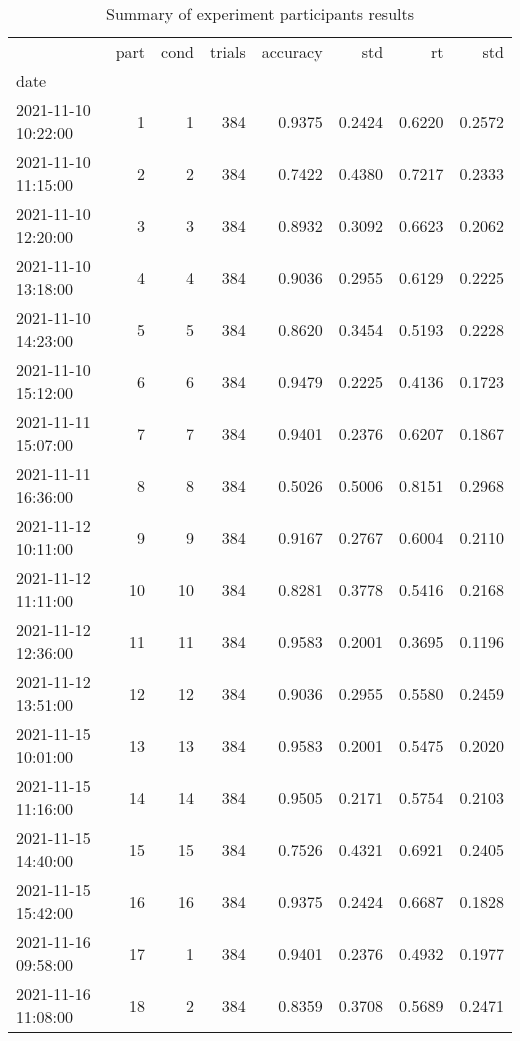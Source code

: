 \begin{table}
\centering
\caption{Summary of experiment participants results}
\label{table-subject-summary}
\begin{tabular}{lrrrrrrr}
\toprule
{} & part & cond & trials & accuracy &    std &     rt &    std \\
date                &      &      &        &          &        &        &        \\
\midrule
2021-11-10 10:22:00 &    1 &    1 &    384 &   0.9375 & 0.2424 & 0.6220 & 0.2572 \\
2021-11-10 11:15:00 &    2 &    2 &    384 &   0.7422 & 0.4380 & 0.7217 & 0.2333 \\
2021-11-10 12:20:00 &    3 &    3 &    384 &   0.8932 & 0.3092 & 0.6623 & 0.2062 \\
2021-11-10 13:18:00 &    4 &    4 &    384 &   0.9036 & 0.2955 & 0.6129 & 0.2225 \\
2021-11-10 14:23:00 &    5 &    5 &    384 &   0.8620 & 0.3454 & 0.5193 & 0.2228 \\
2021-11-10 15:12:00 &    6 &    6 &    384 &   0.9479 & 0.2225 & 0.4136 & 0.1723 \\
2021-11-11 15:07:00 &    7 &    7 &    384 &   0.9401 & 0.2376 & 0.6207 & 0.1867 \\
2021-11-11 16:36:00 &    8 &    8 &    384 &   0.5026 & 0.5006 & 0.8151 & 0.2968 \\
2021-11-12 10:11:00 &    9 &    9 &    384 &   0.9167 & 0.2767 & 0.6004 & 0.2110 \\
2021-11-12 11:11:00 &   10 &   10 &    384 &   0.8281 & 0.3778 & 0.5416 & 0.2168 \\
2021-11-12 12:36:00 &   11 &   11 &    384 &   0.9583 & 0.2001 & 0.3695 & 0.1196 \\
2021-11-12 13:51:00 &   12 &   12 &    384 &   0.9036 & 0.2955 & 0.5580 & 0.2459 \\
2021-11-15 10:01:00 &   13 &   13 &    384 &   0.9583 & 0.2001 & 0.5475 & 0.2020 \\
2021-11-15 11:16:00 &   14 &   14 &    384 &   0.9505 & 0.2171 & 0.5754 & 0.2103 \\
2021-11-15 14:40:00 &   15 &   15 &    384 &   0.7526 & 0.4321 & 0.6921 & 0.2405 \\
2021-11-15 15:42:00 &   16 &   16 &    384 &   0.9375 & 0.2424 & 0.6687 & 0.1828 \\
2021-11-16 09:58:00 &   17 &    1 &    384 &   0.9401 & 0.2376 & 0.4932 & 0.1977 \\
2021-11-16 11:08:00 &   18 &    2 &    384 &   0.8359 & 0.3708 & 0.5689 & 0.2471 \\

\end{tabular}
\end{table}
